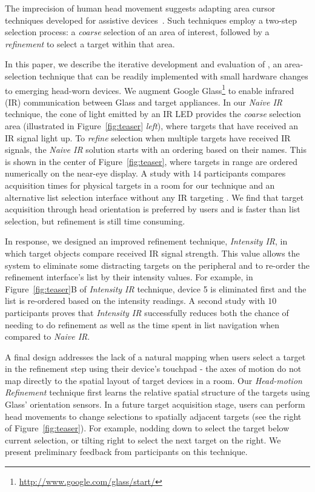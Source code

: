 The imprecision of human head movement suggests adapting area cursor techniques developed for assistive devices~\cite{kabbash1995prince,worden1997making,findlater2010enhanced}. Such techniques employ a two-step selection process: a {\em coarse} selection of an area of interest, followed by a {\em refinement} to select a target within that area.

In this paper, we describe the iterative development and evaluation of \systemnamenospace, an area-selection technique that can be readily implemented with small hardware changes to emerging head-worn devices. We augment Google Glass\footnote{\url{http://www.google.com/glass/start/}} to enable infrared (IR) communication between Glass and target appliances. In our {\em Naive IR} technique, the cone of light emitted by an IR LED %
 provides the {\em coarse} selection area (illustrated in Figure~\ref{fig:teaser} {\em left}), where targets that have received an IR signal light up. To {\em refine} selection when multiple targets have received IR signals, the {\em Naive IR} solution starts with an ordering based on their names. This is shown in the center of Figure~\ref{fig:teaser}, where targets in range are ordered numerically on the near-eye display. A study with $14$ participants compares acquisition times for physical targets in a room for our technique and an alternative list selection interface without any IR targeting  . We find that target acquisition through head orientation is preferred by users and is faster than list selection, but refinement is still time consuming.

In response, we designed an improved refinement technique, {\em Intensity IR}, in which target objects compare received IR signal strength. This value allows the system to eliminate some distracting targets on the peripheral and to re-order the refinement interface's list by their intensity values. For example, in Figure~\ref{fig:teaser}B of {\em Intensity IR} technique, device 5 is eliminated first and the list is re-ordered based on the intensity readings. A second study with $10$ participants proves that {\em Intensity IR} successfully reduces both the chance of needing to do refinement as well as the time spent in list navigation when compared to {\em Naive IR}.

A final design addresses the lack of a natural mapping when users select a target in the refinement step using their device's touchpad - the axes of motion do not map directly to the spatial layout of target devices in a room. Our {\em Head-motion Refinement} technique first learns the relative spatial structure of the targets using Glass' orientation sensors. In a future target acquisition stage, users can perform head movements to change selections to spatially adjacent targets (see the right of Figure~\ref{fig:teaser}). For example, nodding down to select the target below current selection, or tilting right to select the next target on the right. We present preliminary feedback from participants on this technique.

